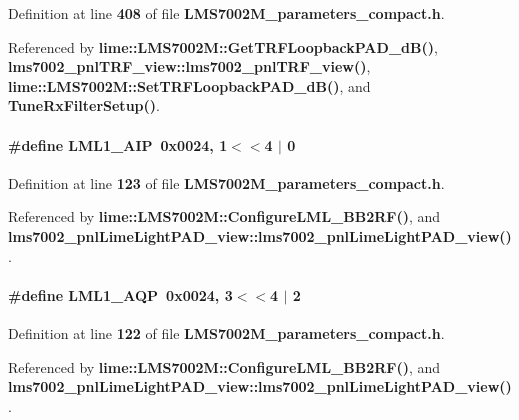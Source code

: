 Definition at line {\bf 408} of file {\bf L\+M\+S7002\+M\+\_\+parameters\+\_\+compact.\+h}.



Referenced by {\bf lime\+::\+L\+M\+S7002\+M\+::\+Get\+T\+R\+F\+Loopback\+P\+A\+D\+\_\+d\+B()}, {\bf lms7002\+\_\+pnl\+T\+R\+F\+\_\+view\+::lms7002\+\_\+pnl\+T\+R\+F\+\_\+view()}, {\bf lime\+::\+L\+M\+S7002\+M\+::\+Set\+T\+R\+F\+Loopback\+P\+A\+D\+\_\+d\+B()}, and {\bf Tune\+Rx\+Filter\+Setup()}.

\paragraph[{L\+M\+L1\+\_\+\+A\+IP}]{\setlength{\rightskip}{0pt plus 5cm}\#define L\+M\+L1\+\_\+\+A\+IP~0x0024, 1$<$$<$4 $\vert$  0}\label{LMS7002M__parameters__compact_8h_a0d36ad03b59ee9e7ebe09e1143c4ce7f}


Definition at line {\bf 123} of file {\bf L\+M\+S7002\+M\+\_\+parameters\+\_\+compact.\+h}.



Referenced by {\bf lime\+::\+L\+M\+S7002\+M\+::\+Configure\+L\+M\+L\+\_\+\+B\+B2\+R\+F()}, and {\bf lms7002\+\_\+pnl\+Lime\+Light\+P\+A\+D\+\_\+view\+::lms7002\+\_\+pnl\+Lime\+Light\+P\+A\+D\+\_\+view()}.

\paragraph[{L\+M\+L1\+\_\+\+A\+QP}]{\setlength{\rightskip}{0pt plus 5cm}\#define L\+M\+L1\+\_\+\+A\+QP~0x0024, 3$<$$<$4 $\vert$  2}\label{LMS7002M__parameters__compact_8h_a8566d9d5db0c272b8645fcae5085a92e}


Definition at line {\bf 122} of file {\bf L\+M\+S7002\+M\+\_\+parameters\+\_\+compact.\+h}.



Referenced by {\bf lime\+::\+L\+M\+S7002\+M\+::\+Configure\+L\+M\+L\+\_\+\+B\+B2\+R\+F()}, and {\bf lms7002\+\_\+pnl\+Lime\+Light\+P\+A\+D\+\_\+view\+::lms7002\+\_\+pnl\+Lime\+Light\+P\+A\+D\+\_\+view()}.

